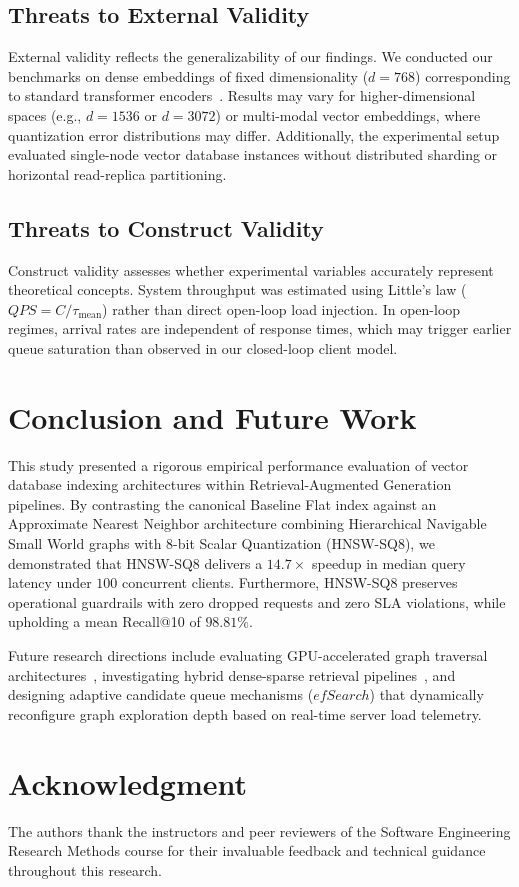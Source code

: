 \documentclass[conference]{IEEEtran}
\begin{document}
\subsection{Threats to External Validity}
External validity reflects the generalizability of our findings. We conducted our benchmarks on dense embeddings of fixed dimensionality ($d=768$) corresponding to standard transformer encoders~\cite{karpukhin2020dpr}. Results may vary for higher-dimensional spaces (e.g., $d=1536$ or $d=3072$) or multi-modal vector embeddings, where quantization error distributions may differ. Additionally, the experimental setup evaluated single-node vector database instances without distributed sharding or horizontal read-replica partitioning.

\subsection{Threats to Construct Validity}
Construct validity assesses whether experimental variables accurately represent theoretical concepts. System throughput was estimated using Little's law ($QPS = C / \tau_{\text{mean}}$) rather than direct open-loop load injection. In open-loop regimes, arrival rates are independent of response times, which may trigger earlier queue saturation than observed in our closed-loop client model.

\section{Conclusion and Future Work}
\label{sec:conclusion}
This study presented a rigorous empirical performance evaluation of vector database indexing architectures within Retrieval-Augmented Generation pipelines. By contrasting the canonical Baseline Flat index against an Approximate Nearest Neighbor architecture combining Hierarchical Navigable Small World graphs with 8-bit Scalar Quantization (HNSW-SQ8), we demonstrated that HNSW-SQ8 delivers a $14.7\times$ speedup in median query latency under $100$ concurrent clients. Furthermore, HNSW-SQ8 preserves operational guardrails with zero dropped requests and zero SLA violations, while upholding a mean Recall@10 of $98.81\%$.

Future research directions include evaluating GPU-accelerated graph traversal architectures~\cite{johnson2019billion}, investigating hybrid dense-sparse retrieval pipelines~\cite{khattab2020colbert}, and designing adaptive candidate queue mechanisms ($efSearch$) that dynamically reconfigure graph exploration depth based on real-time server load telemetry.

\section*{Acknowledgment}
The authors thank the instructors and peer reviewers of the Software Engineering Research Methods course for their invaluable feedback and technical guidance throughout this research.



\end{document}
